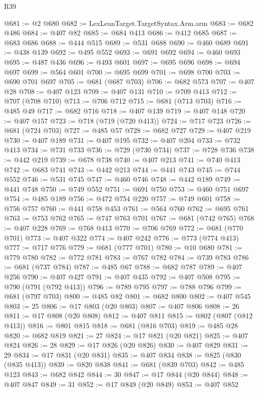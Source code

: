 \begin{lexlean}{R39}
\begin{coremodule}
@681 := @2 @680
@682 := LexLeanTarget.TargetSyntax.Arm.arm
@683 := @682 @486
@684 := @407 @82
@685 := @684 @413
@686 := @412 @685
@687 := @683 @686
@688 := @444 @515
@689 := @531 @688
@690 := @460 @689
@691 := @438 @139
@692 := @495 @552
@693 := @691 @692
@694 := @460 @693
@695 := @487 @436
@696 := @493 @601
@697 := @695 @696
@698 := @694 @697
@699 := @564 @601
@700 := @695 @699
@701 := @698 @700
@703 := @690 @701 @697
@705 := @681 (@687 @703)
@706 := @682 @573
@707 := @407 @28
@708 := @407 @123
@709 := @407 @131
@710 := @709 @413
@712 := @707 (@708 @710)
@713 := @706 @712
@715 := @681 (@713 @703)
@716 := @485 @49
@717 := @682 @716
@718 := @407 @139
@719 := @407 @148
@720 := @407 @157
@723 := @718 (@719 (@720 @413))
@724 := @717 @723
@726 := @681 (@724 @703)
@727 := @485 @57
@728 := @682 @727
@729 := @407 @219
@730 := @407 @189
@731 := @407 @195
@732 := @407 @204
@733 := @732 @413
@734 := @731 @733
@736 := @729 (@730 @734)
@737 := @728 @736
@738 := @442 @219
@739 := @678 @738
@740 := @407 @213
@741 := @740 @413
@742 := @683 @741
@743 := @442 @213
@744 := @441 @743
@745 := @744 @552
@746 := @531 @745
@747 := @460 @746
@748 := @442 @189
@749 := @441 @748
@750 := @749 @552
@751 := @691 @750
@753 := @460 @751 @697
@754 := @485 @189
@756 := @472 @754 @220
@757 := @749 @601
@758 := @756 @757
@760 := @441 @758 @453
@761 := @564 @760
@762 := @695 @761
@763 := @753 @762
@765 := @747 @763 @701
@767 := @681 (@742 @765)
@768 := @407 @228
@769 := @768 @413
@770 := @706 @769
@772 := @681 (@770 @701)
@773 := @407 @322
@774 := @407 @242
@776 := @773 (@774 @413)
@777 := @717 @776
@779 := @681 (@777 @701)
@780 := @10 @680
@781 := @779 @780
@782 := @772 @781
@783 := @767 @782
@784 := @739 @783
@786 := @681 (@737 @784)
@787 := @485 @67
@788 := @682 @787
@789 := @407 @256
@790 := @407 @427
@791 := @407 @435
@792 := @407 @508
@795 := @790 (@791 (@792 @413))
@796 := @789 @795
@797 := @788 @796
@799 := @681 (@797 @703)
@800 := @485 @82
@801 := @682 @800
@802 := @407 @545
@803 := 25
@806 := @17 @803 (@20 @803)
@807 := @407 @806
@808 := 26
@811 := @17 @808 (@20 @808)
@812 := @407 @811
@815 := @802 (@807 (@812 @413))
@816 := @801 @815
@818 := @681 (@816 @703)
@819 := @485 @28
@820 := @682 @819
@821 := 27
@824 := @17 @821 (@20 @821)
@825 := @407 @824
@826 := 28
@829 := @17 @826 (@20 @826)
@830 := @407 @829
@831 := 29
@834 := @17 @831 (@20 @831)
@835 := @407 @834
@838 := @825 (@830 (@835 @413))
@839 := @820 @838
@841 := @681 (@839 @703)
@842 := @485 @123
@843 := @682 @842
@844 := 30
@847 := @17 @844 (@20 @844)
@848 := @407 @847
@849 := 31
@852 := @17 @849 (@20 @849)
@853 := @407 @852

\end{coremodule}
\end{lexlean}
